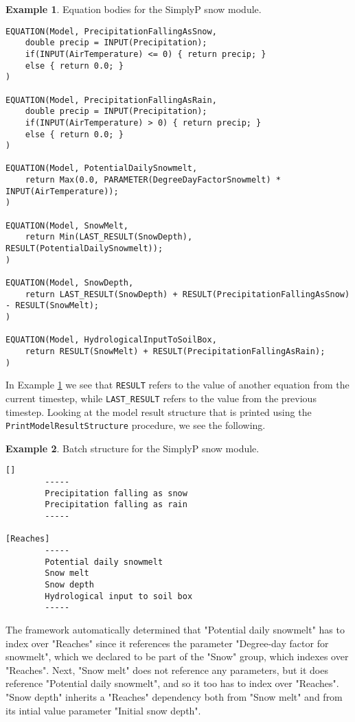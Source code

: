 \documentclass[11pt]{article}
\theoremstyle{definition}
\newtheorem{myexample}{Example}
\newenvironment{example}%
  {\begin{lrbox}{\examplebox}%
   \begin{minipage}{\dimexpr\linewidth-2\fboxsep}
   \begin{myexample}}%
  {\end{myexample}%
   \end{minipage}%
   \end{lrbox}%
   \begin{trivlist}
     \item[]\colorbox{silver}{\usebox\examplebox}
   \end{trivlist}}
\begin{document}
\begin{example}\label{ex:simplypequations}
Equation bodies for the SimplyP snow module.
\begin{lstlisting}[style=mycpp]
EQUATION(Model, PrecipitationFallingAsSnow,
	double precip = INPUT(Precipitation);
	if(INPUT(AirTemperature) <= 0) { return precip; }
	else { return 0.0; }
)

EQUATION(Model, PrecipitationFallingAsRain,
	double precip = INPUT(Precipitation);
	if(INPUT(AirTemperature) > 0) { return precip; }
	else { return 0.0; }
)

EQUATION(Model, PotentialDailySnowmelt,
	return Max(0.0, PARAMETER(DegreeDayFactorSnowmelt) * INPUT(AirTemperature));
)

EQUATION(Model, SnowMelt,
	return Min(LAST_RESULT(SnowDepth), RESULT(PotentialDailySnowmelt));
)

EQUATION(Model, SnowDepth,
	return LAST_RESULT(SnowDepth) + RESULT(PrecipitationFallingAsSnow) - RESULT(SnowMelt);
)

EQUATION(Model, HydrologicalInputToSoilBox,
	return RESULT(SnowMelt) + RESULT(PrecipitationFallingAsRain);
)
\end{lstlisting}
\end{example}

In Example \ref{ex:simplypequations} we see that {\tt RESULT} refers to the value of another equation from the current timestep, while {\tt LAST\_RESULT} refers to the value from the previous timestep. Looking at the model result structure that is printed using the {\tt PrintModelResultStructure} procedure, we see the following.

\begin{example}
Batch structure for the SimplyP snow module.
\begin{lstlisting}[style=textstyle]
[]
        -----
        Precipitation falling as snow
        Precipitation falling as rain
        -----

[Reaches]
        -----
        Potential daily snowmelt
        Snow melt
        Snow depth
        Hydrological input to soil box
        -----
\end{lstlisting}
\end{example}

The framework automatically determined that "Potential daily snowmelt" has to index over "Reaches" since it references the parameter "Degree-day factor for snowmelt", which we declared to be part of the "Snow" group, which indexes over "Reaches". Next, "Snow melt" does not reference any parameters, but it does reference "Potential daily snowmelt", and so it too has to index over "Reaches". "Snow depth" inherits a "Reaches" dependency both from "Snow melt" and from its intial value parameter "Initial snow depth".
\end{document}
